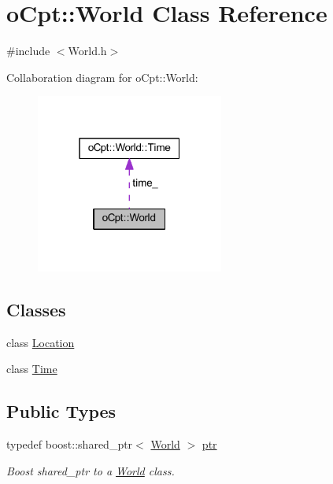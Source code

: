 \hypertarget{classo_cpt_1_1_world}{}\section{o\+Cpt\+:\+:World Class Reference}
\label{classo_cpt_1_1_world}


{\ttfamily \#include $<$World.\+h$>$}



Collaboration diagram for o\+Cpt\+:\+:World\+:\nopagebreak
\begin{figure}[H]
\begin{center}
\leavevmode
\includegraphics[width=175pt]{classo_cpt_1_1_world__coll__graph}
\end{center}
\end{figure}
\subsection*{Classes}
\begin{DoxyCompactItemize}
\item 
class \hyperlink{classo_cpt_1_1_world_1_1_location}{Location}
\item 
class \hyperlink{classo_cpt_1_1_world_1_1_time}{Time}
\end{DoxyCompactItemize}
\subsection*{Public Types}
\begin{DoxyCompactItemize}
\item 
typedef boost\+::shared\+\_\+ptr$<$ \hyperlink{classo_cpt_1_1_world}{World} $>$ \hyperlink{classo_cpt_1_1_world_aa6e591e3096d5de71e0cec9039663d67}{ptr}
\begin{DoxyCompactList}\small\item\em Boost shared\+\_\+ptr to a \hyperlink{classo_cpt_1_1_world}{World} class. \end{DoxyCompactList}\end{DoxyCompactItemize}
